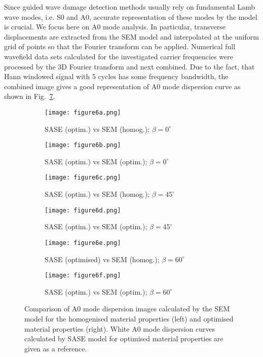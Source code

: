 \documentclass[preprint,12pt]{elsarticle}
\begin{document}
Since guided wave damage detection methods usually rely on fundamental Lamb wave modes, i.e. S0 and A0, accurate representation of these modes by the model is crucial.
We focus here on A0 mode analysis. 
In particular, transverse displacements are extracted from the SEM model and interpolated at the uniform grid of points so that the Fourier transform can be applied. 
Numerical full wavefield data sets calculated for the investigated carrier frequencies were processed by the 3D Fourier transform and next combined. 
Due to the fact, that Hann windowed signal with 5 cycles has some frequency bandwidth, the combined image gives a good representation of A0 mode dispersion curve as shown in Fig.~\ref{fig:homog_opt_num}. 
\begin{figure} [h!]
	\centering
	\begin{subfigure}[b]{0.47\textwidth}
		\centering
		\texttt{[image: figure6a.png]}
		\caption{SASE (optim.) vs SEM (homog.); $\beta=0^{\circ}$}
		\label{fig:dispersion0deg_homog_num}
	\end{subfigure}
	\hfill
	\begin{subfigure}[b]{0.47\textwidth}
		\centering
		\texttt{[image: figure6b.png]}
		\caption{SASE (optim.) vs SEM (optim.); $\beta=0^{\circ}$}
		\label{fig:dispersion0deg_opt_num}
	\end{subfigure}
	\hfill
	\begin{subfigure}[b]{0.47\textwidth}
		\centering
		\texttt{[image: figure6c.png]}
		\caption{SASE (optim.) vs SEM (homog.); $\beta=45^{\circ}$}
		\label{fig:dispersion45deg_homog_num}
	\end{subfigure}
	\hfill
	\begin{subfigure}[b]{0.47\textwidth}
		\centering
		\texttt{[image: figure6d.png]}
		\caption{SASE (optim.) vs SEM (optim.); $\beta=45^{\circ}$}
		\label{fig:dispersion45deg_opt_num}
	\end{subfigure}
	\hfill
	\begin{subfigure}[b]{0.47\textwidth}
		\centering
		\texttt{[image: figure6e.png]}
		\caption{SASE (optimised) vs SEM (homog.); $\beta=60^{\circ}$}
		\label{fig:dispersion60deg_homog_num}
	\end{subfigure}
	\hfill
	\begin{subfigure}[b]{0.47\textwidth}
		\centering
		\texttt{[image: figure6f.png]}
		\caption{SASE (optim.) vs SEM (optim.); $\beta=60^{\circ}$}
		\label{fig:dispersion60deg_opt_num}
	\end{subfigure}
	\caption{Comparison of A0 mode dispersion images calculated by the SEM model for the homogenised material properties (left) and optimised material properties (right). White A0 mode dispersion curves calculated by SASE model for optimised material properties are given as a reference. }
	\label{fig:homog_opt_num}
\end{figure}
\end{document}
